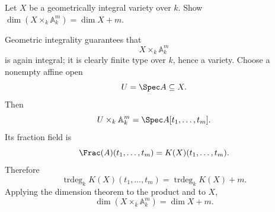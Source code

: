 \begin{problem}\label{prob:vi30-19}
Let \(X\) be a geometrically integral variety over \(k\). Show \(\dim(X\times_k\mathbb A^m_k)=\dim X+m\).

\end{problem}

\ifdefined\FullProblemDossiers
\begin{solution}
Geometric integrality guarantees that
\[
X\times_k\mathbb A^m_k
\]
is again integral; it is clearly finite type over \(k\), hence a variety. Choose a nonempty affine open
\[
U=\Spec A\subseteq X.
\]
Then
\[
U\times_k\mathbb A^m_k
=
\Spec A[t_1,\ldots,t_m].
\]
Its fraction field is
\[
\Frac(A)(t_1,\ldots,t_m)
=
K(X)(t_1,\ldots,t_m).
\]
Therefore
\[
\operatorname{trdeg}_kK(X)(t_1,\ldots,t_m)
=
\operatorname{trdeg}_kK(X)+m.
\]
Applying the dimension theorem to the product and to \(X\),
\[
\boxed{
\dim(X\times_k\mathbb A^m_k)=\dim X+m.
}
\]
\end{solution}
\fi
